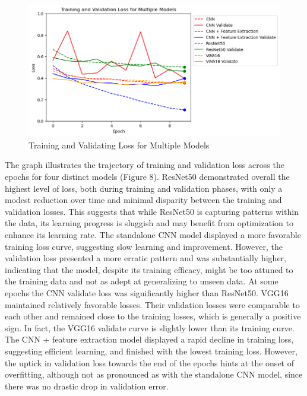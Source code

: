 \documentclass[10pt,twocolumn]{article}
\begin{document}
\begin{figure}[h]
\caption{Training and Validating Loss for Multiple Models}
\includegraphics[scale=0.4]{LossEpochs.png}\newline
\end{figure}

The graph illustrates the trajectory of training and validation loss across the epochs for four distinct models (Figure 8). ResNet50 demonstrated overall the highest level of loss, both during training and validation phases, with only a modest reduction over time and minimal disparity between the training and validation losses. This suggests that while ResNet50 is capturing patterns within the data, its learning progress is sluggish and may benefit from optimization to enhance its learning rate. \newline
The standalone CNN model displayed a more favorable training loss curve, suggesting slow learning and improvement. However, the validation loss presented a more erratic pattern and was substantially higher, indicating that the model, despite its training efficacy, might be too attuned to the training data and not as adept at generalizing to unseen data. At some epochs the CNN validate loss was significantly higher than ResNet50. \newline
VGG16 maintained relatively favorable losses. Their validation losses were comparable to each other and remained close to the training losses, which is generally a positive sign. In fact, the VGG16 validate curve is slightly lower than its training curve. \newline
The CNN + feature extraction model displayed a rapid decline in training loss, suggesting efficient learning, and finished with the lowest training loss. However, the uptick in validation loss towards the end of the epochs hints at the onset of overfitting, although not as pronounced as with the standalone CNN model, since there was no drastic drop in validation error.
\end{document}

